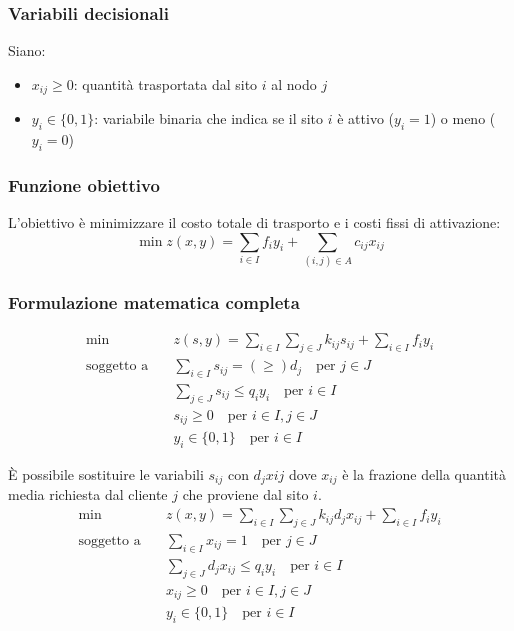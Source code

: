 \subsubsection{Variabili decisionali}
Siano:
\begin{itemize}
    \item $x_{ij} \geq 0$: quantità trasportata dal sito $i$ al nodo $j$
    \item $y_i \in \{0,1\}$: variabile binaria che indica se il sito $i$ è attivo ($y_i = 1$) o meno ($y_i = 0$)
\end{itemize}

\subsubsection{Funzione obiettivo}
L'obiettivo è minimizzare il costo totale di trasporto e i costi fissi di attivazione:
\[
\min z(x, y) = \sum_{i \in I} f_i y_i + \sum_{(i,j) \in A} c_{ij} x_{ij}
\]

\subsubsection{Formulazione matematica completa}
\[
\begin{aligned}
\min \quad & z(s, y) = \sum_{i \in I}\sum_{j \in J} k_{ij} s_{ij} + \sum_{i \in I} f_i y_i\\
\text{soggetto a} \quad & \sum_{i \in I} s_{ij} = (\geq) d_j \quad \text{per } j \in J \\
& \sum_{j \in J} s_{ij} \leq q_i y_i \quad \text{per } i \in I \\
& s_{ij} \geq 0 \quad \text{per } i \in I, j \in J \\
& y_i \in \{0,1\} \quad \text{per } i \in I
\end{aligned}
\]

È possibile sostituire le variabili $s_{ij}$ con $d_{j} x{ij}$ dove $x_{ij}$ è la frazione della quantità media richiesta dal cliente $j$ che proviene dal sito $i$.
\[
\begin{aligned}
\min \quad & z(x, y) = \sum_{i \in I}\sum_{j \in J} k_{ij} d_j x_{ij} + \sum_{i \in I} f_i y_i  \\
\text{soggetto a} \quad & \sum_{i \in I} x_{ij} = 1 \quad \text{per } j \in J \\
& \sum_{j \in J} d_j x_{ij} \leq q_i y_i \quad \text{per } i \in I \\
& x_{ij} \geq 0 \quad \text{per } i \in I, j \in J \\
& y_i \in \{0,1\} \quad \text{per } i \in I
\end{aligned}
\]

